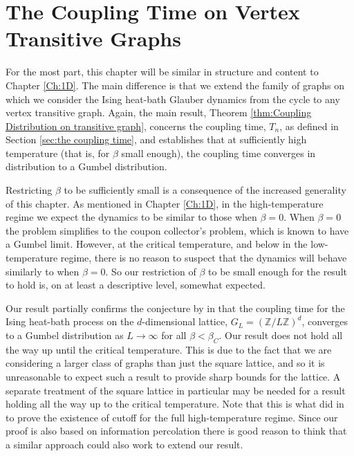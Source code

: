 \chapter{The Coupling Time on Vertex Transitive Graphs}
\label{Ch:GeneralResults}


For the most part, this chapter will be similar in structure and content to Chapter \ref{Ch:1D}. The main difference is that we extend the family of graphs on which we consider the Ising heat-bath Glauber dynamics from the cycle to any vertex transitive graph. Again, the main result, Theorem \ref{thm:Coupling Distribution on transitive graph}, concerns the coupling time, $T_n$, as defined in Section \ref{sec:the coupling time}, and establishes that at sufficiently high temperature (that is, for $\beta$ small enough), the coupling time converges in distribution to a Gumbel distribution.

Restricting $\beta$ to be sufficiently small is a consequence of the increased generality of this chapter. As mentioned in Chapter \ref{Ch:1D}, in the high-temperature regime we expect the dynamics to be similar to those when $\beta = 0$. When $\beta = 0$ the problem simplifies to the coupon collector's problem, which is known to have a Gumbel limit. However, at the critical temperature, and below in the low-temperature regime, there is no reason to suspect that the dynamics will behave similarly to when $\beta = 0$. So our restriction of $\beta$ to be small enough for the result to hold is, on at least a descriptive level, somewhat expected. 

Our result partially confirms the conjecture by \citeauthor{Collevecchio2018-nq} in \cite{Collevecchio2018-nq} that the coupling time for the Ising heat-bath process on the $d$-dimensional lattice, $G_L = (\mathbb{Z}/L\mathbb{Z})^d$, converges to a Gumbel distribution as $L \rightarrow\infty$ for all $\beta < \beta_C$. Our result does not hold all the way up until the critical temperature. This is due to the fact that we are considering a larger class of graphs than just the square lattice, and so it is unreasonable to expect such a result to provide sharp bounds for the lattice. A separate treatment of the square lattice in particular may be needed for a result holding all the way up to the critical temperature. Note that this is what \citeauthor{Lubetzky2013-yv} did in \cite{Lubetzky2013-yv} to prove the existence of cutoff for the full high-temperature regime. Since our proof is also based on information percolation there is good reason to think that a similar approach could also work to extend our result.


